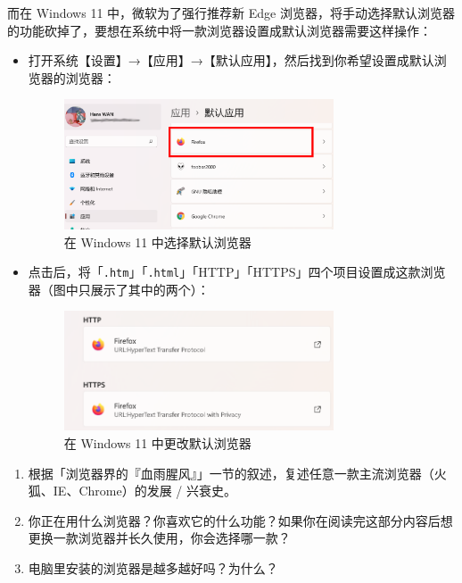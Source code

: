 而在 Windows 11 中，微软为了强行推荐新 Edge 浏览器，将手动选择默认浏览器的功能砍掉了，要想在系统中将一款浏览器设置成默认浏览器需要这样操作：

\begin{itemize}
  \item 打开系统【设置】→【应用】→【默认应用】，然后找到你希望设置成默认浏览器的浏览器：
    \begin{figure}[htb!]
      \centering
      \includegraphics[width=8cm]{assets/Windows_11_default_browser.png}
      \caption{在 Windows 11 中选择默认浏览器}
      \label{Windows_11_default_browser}
    \end{figure}
  \item 点击后，将「\verb|.htm|」「\verb|.html|」「HTTP」「HTTPS」四个项目设置成这款浏览器（图中只展示了其中的两个）：
    \begin{figure}[htb!]
      \centering
      \includegraphics[width=8cm]{assets/Win_11_Change_Browser.png}
      \caption{在 Windows 11 中更改默认浏览器}
      \label{Win_11_Change_Browser}
    \end{figure}
\end{itemize}

\practice

\begin{enumerate}
  \item 根据「浏览器界的『血雨腥风』」一节的叙述，复述任意一款主流浏览器（火狐、IE、Chrome）的发展 / 兴衰史。
  \item 你正在用什么浏览器？你喜欢它的什么功能？如果你在阅读完这部分内容后想更换一款浏览器并长久使用，你会选择哪一款？
  \item 电脑里安装的浏览器是越多越好吗？为什么？
\end{enumerate}